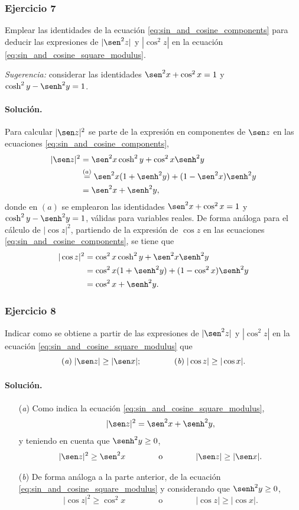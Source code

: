 \documentclass[a4paper]{report}
\begin{document}
\subsubsection{Ejercicio 7}

Emplear las identidades de la ecuación \ref{eq:sin_and_cosine_components} para deducir las expresiones de \(|\sen^2z|\) y \(|\cos^2z|\) en la ecuación \ref{eq:sin_and_cosine_square_modulus}.

\emph{Sugerencia:} considerar las identidades \(\sen^2x+\cos^2x=1\) y \(\cosh^2y-\senh^2y=1\).

\paragraph{Solución.} Para calcular \(|\sen z|^2\) se parte de la expresión en componentes de \(\sen z\) en las ecuaciones \ref{eq:sin_and_cosine_components},
\begin{align*}
 |\sen z|^2&=\sen^2x\cosh^2y+\cos^2x\senh^2y\\
  &\overset{(a)}{=}\sen^2x(1+\senh^2y)+(1-\sen^2x)\senh^2y\\
  &=\sen^2x+\senh^2y,
\end{align*}
donde en \((a)\) se emplearon las identidades \(\sen^2x+\cos^2x=1\) y \(\cosh^2y-\senh^2y=1\), válidas para variables reales. De forma análoga para el cálculo de \(|\cos z|^2\), partiendo de la expresión de \(\cos z\) en las ecuaciones \ref{eq:sin_and_cosine_components}, se tiene que 
\begin{align*}
 |\cos z|^2&=\cos^2x\cosh^2y+\sen^2x\senh^2y\\
  &=\cos^2x(1+\senh^2y)+(1-\cos^2x)\senh^2y\\
  &=\cos^2x+\senh^2y.
\end{align*}

\subsubsection{Ejercicio 8}

Indicar como se obtiene a partir de las expresiones de \(|\sen^2z|\) y \(|\cos^2z|\) en la ecuación \ref{eq:sin_and_cosine_square_modulus} que 
\[
 (\textit{a})\;|\sen z|\geq|\sen x|;\qquad\qquad (\textit{b})\;|\cos z|\geq|\cos x|.
\]

\paragraph{Solución.}
\begin{enumerate}
 \item[(\textit{a})] Como indica la ecuación \ref{eq:sin_and_cosine_square_modulus},
 \[
  |\sen z|^2=\sen^2x+\senh^2y,
 \]
 y teniendo en cuenta que \(\senh^2y\geq0\),
 \[
  |\sen z|^2\geq\sen^2x
  \qquad\qquad\textrm{o}\qquad\qquad
  |\sen z|\geq|\sen x|.
 \]
 \item[(\textit{b})] De forma análoga a la parte anterior, de la ecuación \ref{eq:sin_and_cosine_square_modulus} y considerando que \(\senh^2y\geq0\),
 \[
  |\cos z|^2\geq\cos^2x
  \qquad\qquad\textrm{o}\qquad\qquad
  |\cos z|\geq|\cos x|.
 \]
\end{enumerate}
\end{document}
